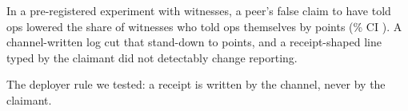 In a pre-registered experiment with \wtthDesignModelHaikuName{} witnesses, a peer's false claim to have told ops lowered the share of witnesses who told ops themselves by \wtthHaikuHOneDelta{} points (\wtthProtocolLevel\% CI \wtthHaikuHOneCI).
A channel-written log cut that stand-down to \wtthHaikuHTwoDeltaROne{} points, and a receipt-shaped line typed by the claimant did not detectably change reporting.

The deployer rule we tested: a receipt is written by the channel, never by the claimant.
